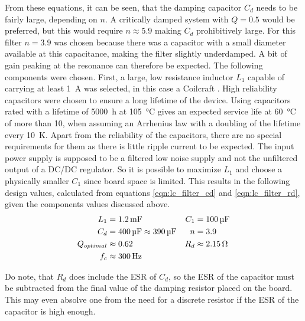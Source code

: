 From these equations, it can be seen, that the damping capacitor $C_d$ needs to be fairly large, depending on $n$. A critically damped system with $Q = \num{0.5}$ would be preferred, but this would require $n \approx 5.9$ making $C_d$ prohibitively large. For this filter $n=3.9$ was chosen because there was a capacitor with a small diameter available at this capacitance, making the filter slightly underdamped. A bit of gain peaking at the resonance can therefore be expected. The following components were chosen. First, a large, low resistance inductor $L_1$ capable of carrying at least \qty{1}{\A} was selected,  in this case a Coilcraft . High reliability capacitors were chosen to ensure a long lifetime of the device. Using capacitors rated with a lifetime of \qty{5000}{\hour} at \qty{105}{\celsius} gives an expected service life at \qty{60}{\celsius} of more than \qty{10}{\year}, when assuming an Arrhenius law with a doubling of the lifetime every \qty{10}{\kelvin}. Apart from the reliability of the capacitors, there are no special requirements for them as there is little ripple current to be expected. The input power supply is supposed to be a filtered low noise supply and not the unfiltered output of a DC/DC regulator. So it is possible to maximize $L_1$ and choose a physically smaller $C_1$ since board space is limited. This results in the following design values, calculated from equations \ref{eqn:lc_filter_cd} and \ref{eqn:lc_filter_rd}, given the components values discussed above.
\begin{align*}
    L_1 &= \qty{1.2}{\mF} & C_1 &= \qty{100}{\uF}\\
    C_d &= \qty{400}{\uF} \approx \qty{390}{\uF} & n &= 3.9\\
    Q_{optimal} &\approx \num{0.62} & R_d & \approx \qty{2.15}{\ohm}\\
    f_c &\approx \qty{300}{\Hz}
\end{align*}

Do note, that $R_d$ does include the ESR of $C_d$, so the ESR of the capacitor must be subtracted from the final value of the damping resistor placed on the board. This may even absolve one from the need for a discrete resistor if the ESR of the capacitor is high enough.

